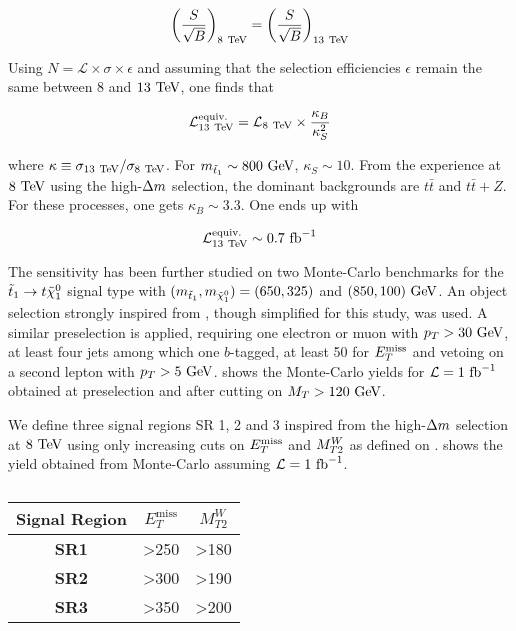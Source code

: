         $$ \left( \frac{S}{\sqrt{B}} \right)_{8~\text{TeV}} = \left( \frac{S}{\sqrt{B}} \right)_{13~\text{TeV}}  $$

        Using $N = \mathcal{L} \times \sigma \times \epsilon$ and assuming that the selection
        efficiencies $\epsilon$ remain the same between $8$ and $13~\text{TeV}$, one finds that

        $$ \mathcal{L}^\text{equiv.}_{13~\text{TeV}} = \mathcal{L}_{8~\text{TeV}} \times \frac{\kappa_B}{\kappa^2_S} $$

        where $\kappa \equiv \sigma_{13~\text{TeV}} / \sigma_{8~\text{TeV}}$. For $m_{\tilde{t}_1} \sim 800~\text{GeV}$,
        $\kappa_S \sim 10$. From the experience at $8~\text{TeV}$ using the high-$\Delta m$ selection,
        the dominant backgrounds are $t\bar{t}$ and $t\bar{t}+Z$. For these processes, one
        gets $\kappa_B \sim 3.3$. One ends up with

        $$ \mathcal{L}^\text{equiv.}_{13~\text{TeV}} \sim 0.7~\text{fb}^{-1}$$

        The sensitivity has been further studied on two Monte-Carlo benchmarks for the
        $\tilde{t}_1 \rightarrow t \tilde{\chi}_1^0$ signal type with $(m_{\tilde{t}_1},
        m_{\tilde{\chi}_1^0}) = (650,325)$ and $(850,100) ~\text{GeV}$. An object selection
        strongly inspired from , though simplified
        for this study, was used. A similar preselection is applied, requiring one electron
        or muon with $p_T > 30~\text{GeV}$, at least four jets among which one $b$-tagged, at least
        50 \GeV for $E_T^\text{miss}$ and vetoing on a second lepton with $p_T > 5~\text{GeV}$. 
        shows the Monte-Carlo yields for $\mathcal{L} = 1~\text{fb}^{-1}$ obtained at preselection
        and after cutting on $M_T > 120~\text{GeV}$.

        \begin{table}
            \centering
            
            \caption{ \label{tab:phys14Preselection}}
        \end{table}

        We define three signal regions SR 1, 2 and 3 inspired from the high-$\Delta m$
        selection at $8~\text{TeV}$ using only increasing cuts on $E_T^\text{miss}$ and $M_{T2}^W$ as defined
        on .  shows the yield
        obtained from Monte-Carlo assuming $\mathcal{L} = 1~\text{fb}^{-1}$.

        \begin{table}
            \centering
            \begin{tabular}{c|cc}
                \textbf{Signal Region} & $E_T^\text{miss}$ & $M_{T2}^W$ \\
                \hline
                \textbf{SR1}           & >250 & >180 \\
                \textbf{SR2}           & >300 & >190 \\
                \textbf{SR3}           & >350 & >200 \\
            \end{tabular}
            \caption{ \label{tab:phys14Cuts}}
        \end{table}

